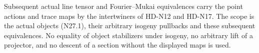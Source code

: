 Subsequent actual line tensor and Fourier--Mukai equivalences
carry the point actions and trace maps by the intertwiners
of HD-N12 and HD-N17. The scope is the actual objects
(N27.1), their arbitrary isogeny pullbacks and these
subsequent equivalences. No equality of object stabilizers
under isogeny, no arbitrary lift of a projector, and no
descent of a section without the displayed maps is used.

